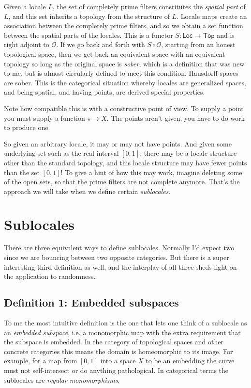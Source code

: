 \documentclass[14pt]{extarticle}
\newcommand{\Locale}{\ensuremath{\mathsf{Loc}}}
\newcommand{\Topcat}{\ensuremath{\mathsf{Top}}}
\renewcommand{\o}{\ensuremath{\mathcal{O}}}
\begin{document}
Given a locale $L$, the set of completely prime filters constitutes the \emph{spatial part} of $L$, and this set inherits a topology from the structure of $L$. Locale maps create an association between the completely prime filters, and so we obtain a set function between the spatial parts of the locales. This is a functor $S:\Locale\to\Topcat$ and is right adjoint to $\o$. If we go back and forth with $S\circ \o$, starting from an honest topological space, then we get back an equivalent space with an equivalent topology so long as the original space is \emph{sober}, which is a definition that was new to me, but is almost circularly defined to meet this condition. Hausdorff spaces are sober. This is the categorical situation whereby locales are generalized spaces, and being spatial, and having points, are derived special properties.

Note how compatible this is with a constructive point of view. To supply a point you must supply a function $\star\to X$. The points aren't given, you have to do work to produce one.

So given an arbitrary locale, it may or may not have points. And given some underlying set such as the real interval $[0,1]$, there may be a locale structure other than the standard topology, and this locale structure may have fewer points than the set $[0,1]$! To give a hint of how this may work, imagine deleting some of the open sets, so that the prime filters are not complete anymore. That's the approach we will take when we define certain \emph{sublocales}.

\section{Sublocales}

There are three equivalent ways to define sublocales. Normally I'd expect two since we are bouncing between two opposite categories. But there is a super interesting third definition as well, and the interplay of all three sheds light on the application to randomness.

\subsection{Definition 1: Embedded subspaces}
To me the most intuitive definition is the one that lets one think of a sublocale as an \emph{embedded subspace}, i.e. a monomorphic map with the extra requirement that the subspace is embedded. In the category of topological spaces and other concrete categories this means the domain is homeomorphic to its image. For example, for a map from $[0,1]$ into a space $X$ to be an embedding the curve must not self-intersect or do anything pathological. In categorical terms the sublocales are \emph{regular monomorphisms}. 
\end{document}
